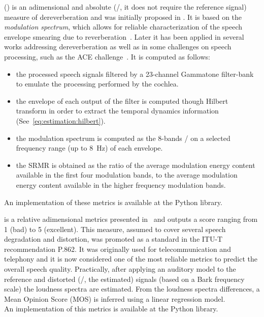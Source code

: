  (\DSRMR) is an adimensional and absolute (\ie/, it does not require the reference signal) measure of dereverberation and was initially proposed in .
It is based on the \textit{modulation spectrum}, which allows for reliable characterization of the speech envelope smearing due to reverberation~.
Later it has been applied in several works addressing dereverberation as well as in some challenges on speech processing, such as the ACE challenge~.
It is computed as follows:
\begin{itemize}
    \item the processed speech signals filtered by a 23-channel Gammatone filter-bank to emulate the processing performed by the cochlea.
    \item the envelope of each output of the filter is computed though Hilbert transform in order to extract the temporal dynamics information (See~\cref{eq:estimation:hilbert}).
    \item the modulation spectrum is computed as the 8-bands \STFT/ on a selected frequency range (up to 8~Hz) of each envelope.
    \item the \ac{SRMR} is obtained as the ratio of the average modulation energy content available in the first four modulation bands,
    to the average modulation energy content available in the higher frequency modulation bands.
\end{itemize}
An implementation of these metrics is available at the \href{https://github.com/aliutkus/speechmetrics/}{} Python library.

 is a relative adimensional metrics presented in~ and outputs a score ranging from 1 (bad) to 5 (excellent).
This measure, assumed to cover several speech degradation and distortion, was promoted as a standard in the ITU-T recommendation P.862.
It was originally used for telecommunication and telephony and it is now considered one of the most reliable metrics to predict the overall speech quality.
Practically, after applying an auditory model to the reference and distorted (\ie/, the estimated) signals (based on a Bark frequency scale) the loudness spectra are estimated.
From the loudness spectra differences, a Mean Opinion Score (MOS) is inferred using a linear regression model.
\\An implementation of this metrics is available at the \href{https://github.com/aliutkus/speechmetrics/}{} Python library.

